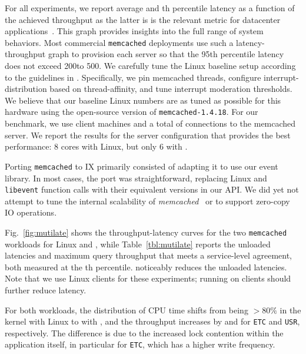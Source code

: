 For all experiments, we report average and th percentile latency as
a function of the achieved throughput as the latter is is the relevant metric
for datacenter applications~\cite{DBLP:journals/cacm/DeanB13}. This
graph provides insights into the full range of system behaviors. Most
commercial \texttt{memcached} deployments use such a
latency-throughput graph to provision each server so that the 95th 
percentile latency does not exceed 200\microsecond to 500\microsecond.
We carefully tune the Linux baseline setup according to the guidelines
in \cite{DBLP:conf/eurosys/LeverichK14}. Specifically, we pin memcached threads,
configure interrupt-distribution based on thread-affinity, and tune
interrupt moderation thresholds. We believe that our baseline Linux
numbers are as tuned as possible for this hardware using the
open-source version of \texttt{memcached-1.4.18}. For our benchmark,
we use  client machines  and a total of  connections to the
memcached server.  We report the results for the server configuration
that provides the best performance: 8 cores with Linux, but only 6
with \ix.

Porting \texttt{memcached} to IX primarily consisted of adapting it to
use our event library. In most cases, the port was straightforward,
replacing Linux and \texttt{libevent} function calls with their
equivalent versions in our API. 
We did yet not attempt to tune the internal scalability of {\it
  memcached}~\cite{DBLP:conf/nsdi/FanAK13} or to support zero-copy IO operations.  




Fig.~\ref{fig:mutilate} shows the throughput-latency curves for the
two \texttt{memcached} workloads for Linux and \ix, while
Table~\ref{tbl:mutilate} reports the unloaded latencies and maximum
query throughput that meets a service-level agreement, both measured
at the th percentile.  \ix noticeably reduces the unloaded
latencies.  Note that we use Linux clients for these experiments;
running \ix on clients should further reduce latency.

For both workloads, the distribution of CPU time shifts from being
$>80\%$ in the kernel with Linux to  with \ix, and the
throughput increases by  and  for
\texttt{ETC} and \texttt{USR}, respectively.
The difference is due to
the increased lock contention within the application itself, in
particular for \texttt{ETC}, which has a higher write frequency.


%

